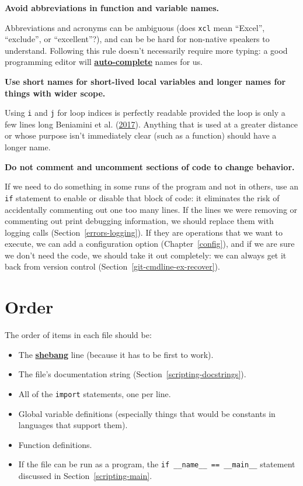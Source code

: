 \documentclass[
]{krantz}
\providecommand{\tightlist}{%
  \setlength{\itemsep}{0pt}\setlength{\parskip}{0pt}}
\newcommand{\gref}[2]{\hyperlink{#2}{\textbf{#1}}}
\begin{document}
\textbf{Avoid abbreviations in function and variable names.}

Abbreviations and acronyms can be ambiguous
(does \texttt{xcl} mean ``Excel'', ``exclude'', or ``excellent''?),
and can be be hard for non-native speakers to understand.
Following this rule doesn't necessarily require more typing:
a good programming editor will \gref{auto-complete}{auto\_completion} names for us.

\textbf{Use short names for short-lived local variables and longer names for things with wider scope.}

Using \texttt{i} and \texttt{j} for loop indices is perfectly readable
provided the loop is only a few lines long Beniamini et al. (\protect\hyperlink{ref-Beni2017}{2017}).
Anything that is used at a greater distance
or whose purpose isn't immediately clear
(such as a function) should have a longer name.

\textbf{Do not comment and uncomment sections of code to change behavior.}

If we need to do something in some runs of the program and not in others,
use an \texttt{if} statement to enable or disable that block of code:
it eliminates the risk of accidentally commenting out one too many lines.
If the lines we were removing or commenting out print debugging information,
we should replace them with logging calls (Section~\ref{errors-logging}).
If they are operations that we want to execute,
we can add a configuration option (Chapter~\ref{config}),
and if we are sure we don't need the code,
we should take it out completely:
we can always get it back from version control
(Section~\ref{git-cmdline-ex-recover}).

\hypertarget{style-order}{%
\section{Order}\label{style-order}}

The order of items in each file should be:

\begin{itemize}
\tightlist
\item
  The \gref{shebang}{shebang} line (because it has to be first to work).
\item
  The file's documentation string (Section~\ref{scripting-docstrings}).
\item
  All of the \texttt{import} statements, one per line.
\item
  Global variable definitions
  (especially things that would be constants in languages that support them).
\item
  Function definitions.
\item
  If the file can be run as a program,
  the \texttt{if\ \_\_name\_\_\ ==\ \textquotesingle{}\_\_main\_\_\textquotesingle{}} statement discussed in
  Section~\ref{scripting-main}.
\end{itemize}
\end{document}
